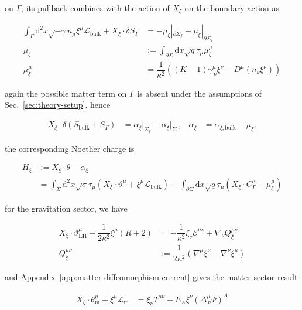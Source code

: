 on $\displaystyle{\Gamma}$, its pullback combines with the action of $\displaystyle{X_{\xi}}$ on the boundary action as

\begin{align}
\int _{\Gamma}\mathrm{d}^{2}x\sqrt{ -\gamma }n_{\mu}\xi ^{\mu}\mathcal{L}_{\mathrm{bulk}}+X_{\xi}\cdot \delta S_{\Gamma} & =-\mu _{\xi}|_{\partial \Sigma _{f}}+\mu _{\xi}|_{\partial \Sigma _{i}} \\
\mu _{\xi} & :=\int _{\partial \Sigma}\mathrm{d}x\sqrt{ q }\tau _{\mu}\mu _{\xi}^{\mu} \\
\mu _{\xi}^{\mu} & =\dfrac{1}{\kappa ^{2}}((K-1)\gamma ^{\mu}_{~\nu}\xi ^{\nu}-D^{\mu}(n_{\nu}\xi ^{\nu}))
\end{align}

again the possible matter term on $\displaystyle{\Gamma}$ is absent under the assumptions of Sec.~\ref{sec:theory-setup}. hence

\begin{align}
X_{\xi}\mathbin{\cdot}\delta(S_{\mathrm{bulk}}+S_{\Gamma}) & =\alpha _{\xi}\big|_{\Sigma _f}-\alpha _{\xi}\big|_{\Sigma _i}, & \alpha _{\xi}&=\alpha _{\xi,\mathrm{bulk}}-\mu _{\xi}.
\end{align}

the corresponding Noether charge is

\begin{align}
H_{\xi} & := X_{\xi}\cdot \theta-\alpha _{\xi} \\
 & =\int _{\Sigma}\mathrm{d}^{2}x\sqrt{ \sigma }\tau _{\mu}(X_{\xi}\cdot \vartheta ^{\mu}+\xi ^{\mu}\mathcal{L}_{\mathrm{bulk}})-\int _{\partial \Sigma}\mathrm{d}x\sqrt{ q }\tau _{\mu}\left(X_{\xi}\cdot C_{\Gamma}^{\mu}-\mu _{\xi}^{\mu}\right)
\end{align}

for the gravitation sector, we have

\begin{align}
X_{\xi}\cdot \vartheta _{\mathrm{EH}}^{\mu}+\dfrac{1}{2\kappa ^{2}}\xi ^{\mu}(R+2) & =-\dfrac{1}{\kappa ^{2}}\xi _{\nu}\mathcal{E}^{\mu \nu}+\nabla _{\nu}Q_{\xi}^{\mu \nu} \\
Q_{\xi}^{\mu \nu} & := \dfrac{1}{2\kappa ^{2}}(\nabla ^{\mu}\xi ^{\nu}-\nabla ^{\nu}\xi ^{\mu})
\end{align}

and Appendix~\ref{app:matter-diffeomorphism-current} gives the matter sector result

\begin{align}
X_{\xi}\cdot \theta _{\mathrm{m}}^{\mu}+\xi ^{\mu}\mathcal{L}_{\mathrm{m}} & =\xi _{\nu}T^{\mu \nu}+E_{A}\xi ^{\nu}(\Delta ^{\mu}_{~\nu}\Psi)^{A}
\end{align}

